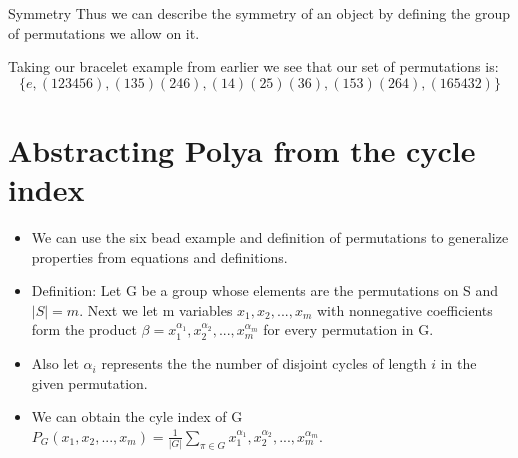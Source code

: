 \documentclass{beamer}
\begin{document}
\begin{frame}{Symmetry}
	Thus we can describe the symmetry of an object by defining the group of permutations we allow on it.

  Taking our bracelet example from earlier we see that our set of permutations is:
  \[\{e,(123456),(135)(246),(14)(25)(36),(153)(264),(165432)\}\]
\end{frame}
\section{Abstracting Polya from the cycle index}

\begin{frame}
\begin{itemize}

\item We can use the six bead example and definition of permutations to generalize properties from equations and definitions.

\item Definition: Let G be a group whose elements are the permutations on S and ${|S|} = m$. Next we let m variables $x_{1}, x_{2},...,x_{m}$ with nonnegative coefficients form the product $\beta = x_{1}^{\alpha_{1}}, x_{2}^{\alpha_{2}},...,x_{m}^{\alpha_{m}}$ for every permutation in G.

\item Also let $\alpha_{i}$ represents the the number of disjoint cycles of length $i$ in the given permutation.

\end{itemize}
\end{frame}


\begin{frame}
\begin{itemize}

\item We can obtain the cyle index of G $P_{G}(x_{1},x_{2},...,x_{m})=\frac{1}{\vert{G}\vert}\sum_{{\pi} \in G}x_{1}^{\alpha_{1}},x_{2}^{\alpha_{2}},...,x_{m}^{\alpha_{m}}$.


\end{itemize}
\end{frame}

\end{document}
